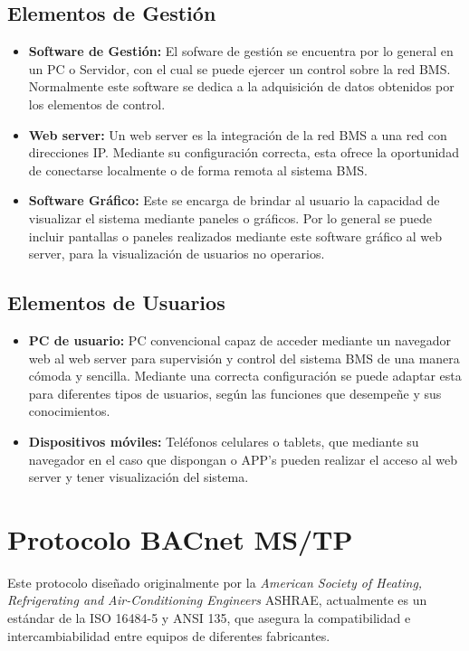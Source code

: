 \subsection{Elementos de Gestión}
\begin{itemize}
\item \textbf{Software de Gestión:}
El sofware de gestión se encuentra por lo general en un PC o Servidor, con el cual se puede ejercer un control sobre la red BMS. Normalmente este software se dedica a la adquisición de datos obtenidos por los elementos de control.
\item \textbf{Web server:}
Un web server es la integración de la red BMS a una red con direcciones IP. Mediante su configuración correcta, esta ofrece la oportunidad de conectarse localmente o de forma remota al sistema BMS.
\item \textbf{Software Gráfico:}
Este se encarga de brindar al usuario la capacidad de visualizar el sistema mediante paneles o gráficos. Por lo general se puede incluir pantallas o paneles realizados mediante este software gráfico al web server, para la visualización de usuarios no operarios.
\end{itemize}
\subsection{Elementos de Usuarios}
\begin{itemize}
\item \textbf{PC de usuario:}
PC convencional capaz de acceder mediante un navegador web al web server para supervisión y control del sistema BMS de una manera cómoda y sencilla. Mediante una correcta configuración se puede adaptar esta para diferentes tipos de usuarios, según las funciones que desempeñe y sus conocimientos.
\item \textbf{Dispositivos móviles:}
Teléfonos celulares o tablets, que mediante su navegador en el caso que dispongan o APP's pueden realizar el acceso al web server y tener visualización del sistema.

\end{itemize}

\section{Protocolo BACnet MS/TP}

Este protocolo diseñado originalmente por la \textit{American Society of Heating, Refrigerating and Air-Conditioning Engineers} ASHRAE, actualmente es un estándar de la ISO 16484-5 y ANSI 135\cite{BACnetProtocol}, que asegura la compatibilidad e intercambiabilidad entre equipos de diferentes fabricantes.

